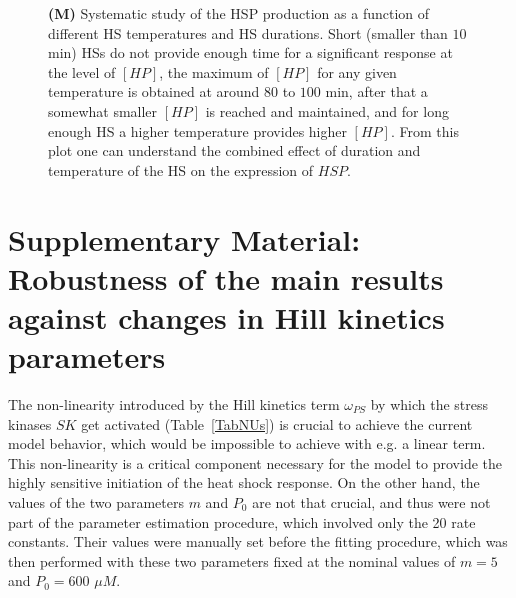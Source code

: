 \documentclass[oneside, 10pt, a4paper, twocolumn]{article}
\begin{document}
\begin{figure}
{{%
\textbf{(M)} Systematic study of the HSP production as a function of different HS temperatures and HS durations. Short (smaller than $10$ min) HSs do not provide enough time for a significant response at the level of $\left[HP\right]$, the maximum of $\left[HP\right]$ for any given temperature is obtained at around $80$ to $100$ min, after that a somewhat smaller $\left[HP\right]$ is reached and maintained, and for long enough HS a higher temperature provides higher $\left[HP\right]$. From this plot one can understand {the combined effect of duration and temperature of the HS on the expression of $HSP$.}}
}
\label{Figure8label}
\end{figure}



\clearpage

\section{{Supplementary Material: Robustness of the main results against changes in Hill kinetics parameters}}
\label{SecRobustness}

{The non-linearity introduced by the Hill kinetics term $\omega_{PS}$ by which the stress kinases $SK$ get activated (Table~\ref{TabNUs}) is crucial to achieve the current model behavior, which would be impossible to achieve with e.g. a linear term. This non-linearity is a critical component necessary for the model to provide the highly sensitive initiation of the heat shock response. On the other hand, the values of the two parameters $m$ and $P_0$ are not that crucial, and thus were not part of the parameter estimation procedure, which involved only the 20 rate constants. Their values were manually set before the fitting procedure, which was then performed with these two parameters fixed at the nominal values of $m=5$ and $P_0=600$ $\mu M$.} 
\end{document}
